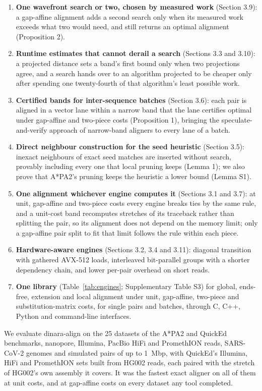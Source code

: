 \begin{enumerate}
  \item \textbf{One wavefront search or two, chosen by measured work} (Section 3.9): a gap-affine alignment adds a second search only when its measured work exceeds what two would need, and still returns an optimal alignment (Proposition 2).
  \item \textbf{Runtime estimates that cannot derail a search} (Sections 3.3 and 3.10): a projected distance sets a band's first bound only when two projections agree, and a search hands over to an algorithm projected to be cheaper only after spending one twenty-fourth of that algorithm's least possible work.
  \item \textbf{Certified bands for inter-sequence batches} (Section 3.6): each pair is aligned in a vector lane within a narrow band that the lane certifies optimal under gap-affine and two-piece costs (Proposition 1), bringing the speculate-and-verify approach of narrow-band aligners \citep{Gibrat2018band,Fujiki2020seedex} to every lane of a batch.
  \item \textbf{Direct neighbour construction for the seed heuristic} (Section 3.5): inexact neighbours of exact seed matches are inserted without search, provably including every one that local pruning keeps (Lemma 1); we also prove that A*PA2's pruning keeps the heuristic a lower bound (Lemma S1).
  \item \textbf{One alignment whichever engine computes it} (Sections 3.1 and 3.7): at unit, gap-affine and two-piece costs every engine breaks ties by the same rule, and a unit-cost band recomputes stretches of its traceback rather than splitting the pair, so its alignment does not depend on the memory limit; only a gap-affine pair split to fit that limit follows the rule within each piece.
  \item \textbf{Hardware-aware engines} (Sections 3.2, 3.4 and 3.11): diagonal transition with gathered AVX-512 loads, interleaved bit-parallel groups with a shorter dependency chain, and lower per-pair overhead on short reads.
  \item \textbf{One library} (Table~\ref{tab:engines}; Supplementary Table S3) for global, ends-free, extension and local alignment under unit, gap-affine, two-piece and substitution-matrix costs, for single pairs and batches, through C, C++, Python and command-line interfaces.
\end{enumerate}

We evaluate dinara-align on the 25 datasets of the A*PA2 and QuickEd benchmarks, nanopore, Illumina, PacBio HiFi and PromethION reads, SARS-CoV-2 genomes and simulated pairs of up to 1~Mbp, with QuickEd's Illumina, HiFi and PromethION sets built from HG002 reads, each paired with the stretch of HG002's own assembly it covers. It was the fastest exact aligner on all of them at unit costs, and at gap-affine costs on every dataset any tool completed.
